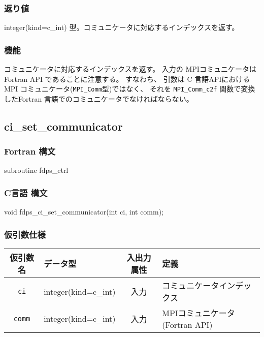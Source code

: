 \subsubsection*{返り値}
integer(kind=c\_int) 型。コミュニケータに対応するインデックスを返す。

\subsubsection*{機能}
コミュニケータに対応するインデックスを返す。
入力の MPIコミュニケータは Fortran API であることに注意する。
すなわち、 引数は C 言語APIにおける MPI コミュニケータ({\tt MPI\_Comm}型)ではなく、
それを {\tt MPI\_Comm\_c2f} 関数で変換したFortran 言語でのコミュニケータでなければならない。


\subsection{ci\_set\_communicator}
\subsubsection*{Fortran 構文}
\begin{screen}
\begin{spverbatim}
subroutine fdps_ctrl%
\end{spverbatim}
\end{screen}

\subsubsection*{C言語 構文}
\begin{screen}
\begin{spverbatim}
void fdps_ci_set_communicator(int ci, int comm);
\end{spverbatim}
\end{screen}

\subsubsection*{仮引数仕様}
\begin{table}[h]
\begin{tabularx}{\linewidth}{cXcX}
\toprule
\rowcolor{Snow2}
仮引数名 & データ型 & 入出力属性 & 定義 \\
\midrule
\verb|ci| & integer(kind=c\_int) & 入力 & コミュニケータインデックス\\
\verb|comm| & integer(kind=c\_int) & 入力 & MPIコミュニケータ(Fortran API)\\
\bottomrule
\end{tabularx}
\end{table}


